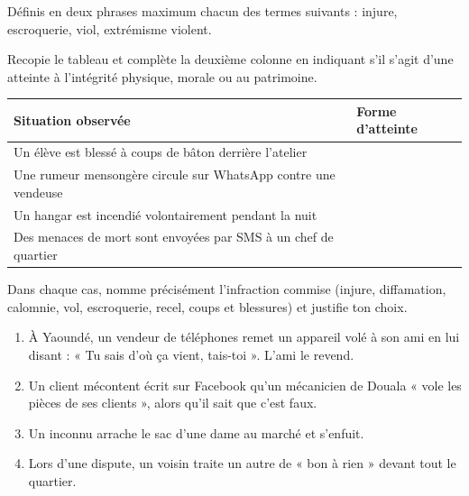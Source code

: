 \documentclass[11pt]{article}
\newcommand{\cle}[1]{{\popxbold\color{popdark}#1}}
\newcounter{popsec}
\newcounter{popsub}
\newcommand{\courssub}[1]{%
  \stepcounter{popsub}%
  \par\vspace{9pt}\noindent{\popxbold\fontsize{11.5}{13}\selectfont\color{popink}{\color{poporange}\thepopsec.\thepopsub}\hspace{6pt}#1}\par\nopagebreak\vspace{4pt}
}
\begin{document}
\begin{exercice}
Définis en deux phrases maximum chacun des termes suivants : \cle{injure}, \cle{escroquerie}, \cle{viol}, \cle{extrémisme violent}.
\end{exercice}

\begin{exercice}
Recopie le tableau et complète la deuxième colonne en indiquant s'il s'agit d'une atteinte à l'intégrité \cle{physique}, \cle{morale} ou au \cle{patrimoine}.
\begin{center}
\begin{tabularx}{\linewidth}{|X|l|}
\hline
\rowcolor{popblueL} \textbf{Situation observée} & \textbf{Forme d'atteinte} \\
\hline
Un élève est blessé à coups de bâton derrière l'atelier & \\
\hline
Une rumeur mensongère circule sur WhatsApp contre une vendeuse & \\
\hline
Un hangar est incendié volontairement pendant la nuit & \\
\hline
Des menaces de mort sont envoyées par SMS à un chef de quartier & \\
\hline
\end{tabularx}
\end{center}
\end{exercice}

\courssub{Je m'entraîne}

\begin{exercice}
Dans chaque cas, nomme précisément l'infraction commise (injure, diffamation, calomnie, vol, escroquerie, recel, coups et blessures) et justifie ton choix.
\begin{enumerate}
\item À Yaoundé, un vendeur de téléphones remet un appareil volé à son ami en lui disant : « Tu sais d'où ça vient, tais-toi ». L'ami le revend.
\item Un client mécontent écrit sur Facebook qu'un mécanicien de Douala « vole les pièces de ses clients », alors qu'il sait que c'est faux.
\item Un inconnu arrache le sac d'une dame au marché et s'enfuit.
\item Lors d'une dispute, un voisin traite un autre de « bon à rien » devant tout le quartier.
\end{enumerate}
\end{exercice}
\end{document}
